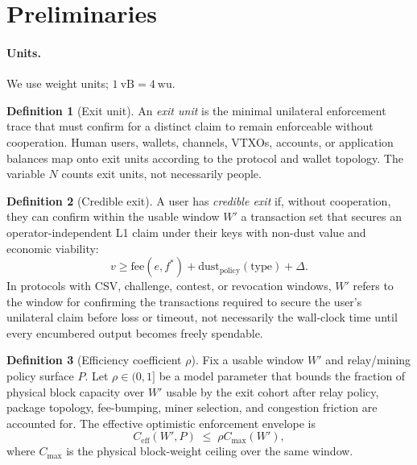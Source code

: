 \documentclass{article}
\theoremstyle{definition}
\newtheorem{definition}{Definition}
\begin{document}
\section{Preliminaries}
\paragraph{Units.} We use weight units; $1~\mathrm{vB} = 4~\mathrm{wu}$.

\begin{definition}[Exit unit]
An \emph{exit unit} is the minimal unilateral enforcement trace that must confirm for a distinct claim to remain enforceable without cooperation. Human users, wallets, channels, VTXOs, accounts, or application balances map onto exit units according to the protocol and wallet topology. The variable $N$ counts exit units, not necessarily people.
\end{definition}

\begin{definition}[Credible exit]
A user has \emph{credible exit} if, without cooperation, they can confirm within the usable window $W'$ a transaction set that secures an operator-independent L1 claim under their keys with non-dust value and economic viability:
\small
\begin{equation*}
v \ge \mathrm{fee}(e,f^*) + \mathrm{dust}_{\mathrm{policy}}(\mathrm{type}) + \Delta.
\end{equation*}
\normalsize
In protocols with CSV, challenge, contest, or revocation windows, $W'$ refers to the window for confirming the transactions required to secure the user's unilateral claim before loss or timeout, not necessarily the wall-clock time until every encumbered output becomes freely spendable.
\end{definition}


\begin{definition}[Efficiency coefficient $\rho$]
Fix a usable window $W'$ and relay/mining policy surface $P$. Let $\rho \in (0,1]$ be a model parameter that bounds the fraction of physical block capacity over $W'$ usable by the exit cohort after relay policy, package topology, fee-bumping, miner selection, and congestion friction are accounted for. The effective optimistic enforcement envelope is
\small
\begin{equation*}
C_{\mathrm{eff}}(W',P) \;\le\; \rho C_{\max}(W'),
\end{equation*}
\normalsize
where $C_{\max}$ is the physical block-weight ceiling over the same window.
\end{definition}
\end{document}
